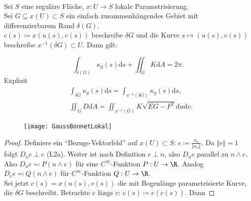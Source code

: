 \begin{theorem}
  \  \\
  Sei \( S \) eine reguläre Fläche, \( x: U \to S \) lokale Parametrisierung. \\
  Sei \( G \subseteq x(U) \subset S \) ein einfach zusammenhängendes Gebiet mit differenzierbarem Rand \( \delta(G) \). \\
  \( c(s) \coloneqq x(u(s), v(s)) \) beschreibe \( \delta G \) und die Kurve \( s \mapsto (u(s), v(s)) \) beschreibe \( x^{-1}(\delta G) \subset U \). Dann gilt:

  \begin{minipage}{.6\textwidth}
    \begin{equation*}
      \int_{\delta(G)}\kappa_g(s)\text{d}s + \iint_G K\text{d}A = 2\pi\text{.}
    \end{equation*}  
    Explizit
    \begin{align*}
      &\int_{\delta G}\kappa_g(s)\text{d} s = \int_{x^{-1}(\delta G)} \kappa_g(s)\text{d} s\text{,} \\
      &\iint_{G}D\text{d}A = \iint_{x^{-1}(G)}K\sqrt{EG - F^2}\text{d}u\text{d}v\text{.}
    \end{align*}
  \end{minipage}
  \hfill
  \begin{minipage}{.375\textwidth}
    \begin{figure}[H]
      \texttt{[image: GaussBonnetLokal]}
    \end{figure}
  \end{minipage}
  \begin{proof}
    Definiere ein ``Bezugs-Vektorfeld'' auf \( x(U) \subset S \): \( e \coloneqq \frac{x_u}{\left\Vert x_u \right\Vert} \). Da \( \left\Vert e \right\Vert = 1 \) folgt \( D_u e \perp e \) (L2a). Weiter ist nach Definition \( e \perp n \), also \( D_u e \) parallel zu \( n \wedge e \). Also \( D_u e \eqqcolon P(n \wedge e) \) für eine \( C^\infty \)-Funktion \( P : U \to \R \). Analog \( D_v e \eqqcolon Q(n \wedge e) \) für \( C^\infty \)-Funktion \( Q: U \to \R \). \\
    Sei jetzt \( c(s) = x(u(s),v(s)) \) die mit Bogenlänge parametrisierte Kurve, die \( \delta G \) beschreibt. Betrachte \( e \) längs \( c \): \( e(s) \coloneqq e(c(s)) \). Dann


\end{proof}
\end{theorem}
